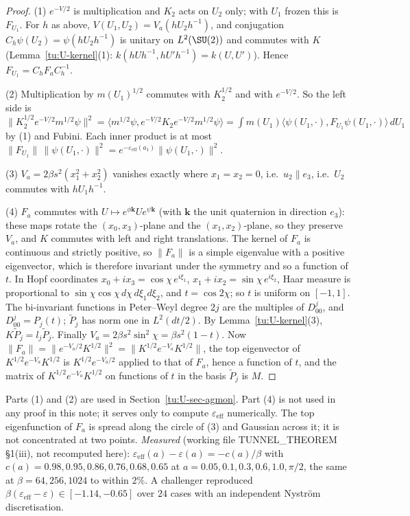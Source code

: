 \begin{proof}
(1) $e^{-V/2}$ is multiplication and $K_2$ acts on $U_2$ only; with $U_1$ frozen this is $F_{U_1}$. For
$h$ as above, $V(U_1,U_2)=V_{a}(hU_2h^{-1})$, and conjugation $C_h\psi(U_2)=\psi(hU_2h^{-1})$ is unitary on
$L^2(\SU(2))$ and commutes with $K$ (Lemma~\ref{tu:U-kernel}(1): $k(hUh^{-1},hU'h^{-1})=k(U,U')$). Hence
$F_{U_1}=C_hF_aC_h^{-1}$.

(2) Multiplication by $m(U_1)^{1/2}$ commutes with $K_2^{1/2}$ and with $e^{-V/2}$. So the left side is
$\|K_2^{1/2}e^{-V/2}m^{1/2}\psi\|^2=\langle m^{1/2}\psi,e^{-V/2}K_2e^{-V/2}m^{1/2}\psi\rangle
=\int m(U_1)\langle\psi(U_1,\cdot),F_{U_1}\psi(U_1,\cdot)\rangle\,dU_1$ by (1) and Fubini. Each inner product is at
most $\|F_{U_1}\|\,\|\psi(U_1,\cdot)\|^2=e^{-\varepsilon_{\mathrm{eff}}(a_1)}\|\psi(U_1,\cdot)\|^2$.

(3) $V_a=2\beta s^2(x_1^2+x_2^2)$ vanishes exactly where $x_1=x_2=0$, i.e.\ $u_2\parallel e_3$, i.e.\ $U_2$
commutes with $hU_1h^{-1}$.

(4) $F_a$ commutes with $U\mapsto e^{\phi\mathbf{k}}Ue^{\psi\mathbf{k}}$ (with $\mathbf{k}$ the unit quaternion
in direction $e_3$): these maps rotate the $(x_0,x_3)$-plane and the $(x_1,x_2)$-plane, so they preserve
$V_a$, and $K$ commutes with left and right translations. The kernel of $F_a$ is continuous and strictly
positive, so $\|F_a\|$ is a simple eigenvalue with a positive eigenvector, which is therefore invariant
under the symmetry and so a function of $t$. In Hopf coordinates $x_0+ix_3=\cos\chi\,e^{i\xi_1}$,
$x_1+ix_2=\sin\chi\,e^{i\xi_2}$, Haar measure is proportional to $\sin\chi\cos\chi\,d\chi\,d\xi_1d\xi_2$, and
$t=\cos2\chi$; so $t$ is uniform on $[-1,1]$. The bi-invariant functions in Peter--Weyl degree $2j$ are the
multiples of $D^j_{00}$, and $D^j_{00}=P_j(t)$; $\tilde P_j$ has norm one in $L^2(dt/2)$. By
Lemma~\ref{tu:U-kernel}(3), $K\tilde P_j=l_j\tilde P_j$. Finally $V_a=2\beta s^2\sin^2\chi=\beta s^2(1-t)$. Now
$\|F_a\|=\|e^{-V_a/2}K^{1/2}\|^2=\|K^{1/2}e^{-V_a}K^{1/2}\|$, the top eigenvector of $K^{1/2}e^{-V_a}K^{1/2}$ is
$K^{1/2}e^{-V_a/2}$ applied to that of $F_a$, hence a function of $t$, and the matrix of
$K^{1/2}e^{-V_a}K^{1/2}$ on functions of $t$ in the basis $\tilde P_j$ is $M$.
\end{proof}

\begin{remark}\label{tu:U-R-rem}
Parts (1) and (2) are used in Section~\ref{tu:U-sec-agmon}. Part (4) is not used in any proof in this
note; it serves only to compute $\varepsilon_{\mathrm{eff}}$ numerically. The top eigenfunction of $F_a$ is
spread along the circle of (3) and Gaussian across it; it is not concentrated at two points.
\emph{Measured} (working file TUNNEL\_THEOREM \S1(iii), not recomputed here):
$\varepsilon_{\mathrm{eff}}(a)-\varepsilon(a)=-c(a)/\beta$ with $c(a)=0.98,0.95,0.86,0.76,0.68,0.65$ at
$a=0.05,0.1,0.3,0.6,1.0,\pi/2$, the same at $\beta=64,256,1024$ to within $2\%$. A challenger
reproduced $\beta(\varepsilon_{\mathrm{eff}}-\varepsilon)\in[-1.14,-0.65]$ over $24$ cases with an independent
Nystr\"om discretisation.
\end{remark}

